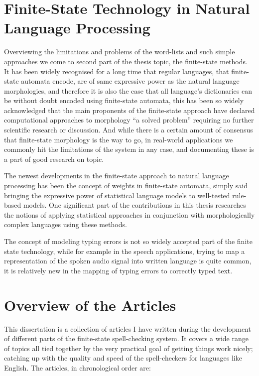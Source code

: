 \documentclass[officiallayout]{unihelcompling}
\begin{document}
\section{Finite-State Technology in Natural Language Processing}
\label{sec:finite-state-technology-in-nlp}

Overviewing the limitations and problems of the word-lists and such simple
approaches we come to second part of the thesis topic, the finite-state
methods.  It has been widely recognised for a long time that regular languages,
that finite-state automata encode, are of same expressive power as the natural
language morphologies, and therefore it is also the case that all language's
dictionaries can be without doubt encoded using finite-state automata, this has
been so widely acknowledged that the main proponents of the finite-state
approach have declared computational approaches to morphology ``a solved
problem'' requiring no further scientific research or discussion. And while
there is a certain amount of consensus that finite-state morphology is the way
to go, in real-world applications we commonly hit the limitations of the 
system in any case, and documenting these is a part of good research on topic.

The newest developments in the finite-state approach to natural
language processing has been the concept of weights in finite-state automata,
simply said bringing the expressive power of statistical language models to
well-tested rule-based models. One significant part of the contributions in
this thesis researches the notions of applying statistical approaches in
conjunction with morphologically complex languages using these 
methods.

The concept of modeling typing errors is not so widely accepted part of the
finite state technology, while for example in the speech applications, trying
to map a representation of the spoken audio signal into written language is
quite common, it is relatively new in the mapping of typing errors to correctly
typed text.

\section{Overview of the Articles}
\label{sec:articles}

This dissertation is a collection of articles I have written during the
development of different parts of the finite-state spell-checking system. It
covers a wide range of topics all tied together by the very practical goal of
getting things work nicely; catching up with the quality and speed of the
spell-checkers for languages like English. The articles, in chronological order
are:
\end{document}
